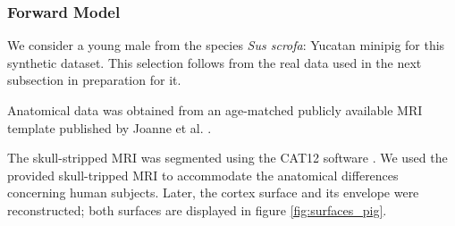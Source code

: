 \subsubsection{Forward Model}

We consider a young male from the species \textit{Sus scrofa}: Yucatan minipig for this synthetic dataset.
%
This selection follows from the real data used in the next subsection in preparation for it.

Anatomical data was obtained from an age-matched publicly available MRI template published by Joanne et al. \cite{pig_template}.

The skull-stripped MRI was segmented using 
the CAT12 software \cite{gaser2022cat}.
%
We used the provided skull-tripped MRI to accommodate the anatomical differences concerning human subjects.
%
Later, the cortex surface and its envelope were reconstructed; both surfaces are displayed in figure \ref{fig:surfaces_pig}.

